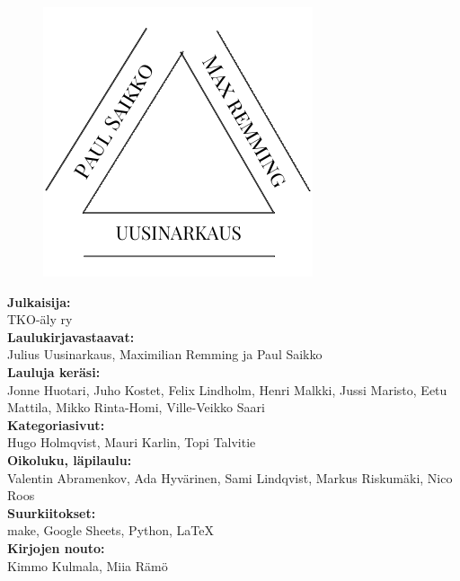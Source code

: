 

\begin{figure}[t]
\vspace{-0.8cm}
\centering
\includegraphics[scale=0.70]{graphics/tekijat.pdf}
\vspace{-0.9cm}
\end{figure}

\noindent
\textbf{Julkaisija:} \\
\noindent
TKO-äly ry \\

\noindent
\textbf{Laulukirjavastaavat:} \\
\noindent
Julius Uusinarkaus, Maximilian Remming ja Paul Saikko \\

\noindent
\textbf{Lauluja keräsi:} \\
\noindent
Jonne Huotari, Juho Kostet, Felix Lindholm, Henri Malkki, Jussi Maristo, Eetu Mattila, Mikko Rinta-Homi, Ville-Veikko Saari\\

\noindent
\textbf{Kategoriasivut:} \\
\noindent
Hugo Holmqvist, Mauri Karlin, Topi Talvitie \\

\noindent
\textbf{Oikoluku, läpilaulu:} \\
\noindent
Valentin Abramenkov, Ada Hyvärinen, Sami Lindqvist, Markus Riskumäki, Nico Roos\\

\noindent
\textbf{Suurkiitokset:} \\
\noindent
make, Google Sheets, Python, \LaTeX \\

\noindent
\textbf{Kirjojen nouto:} \\
\noindent
Kimmo Kulmala, Miia Rämö \\

